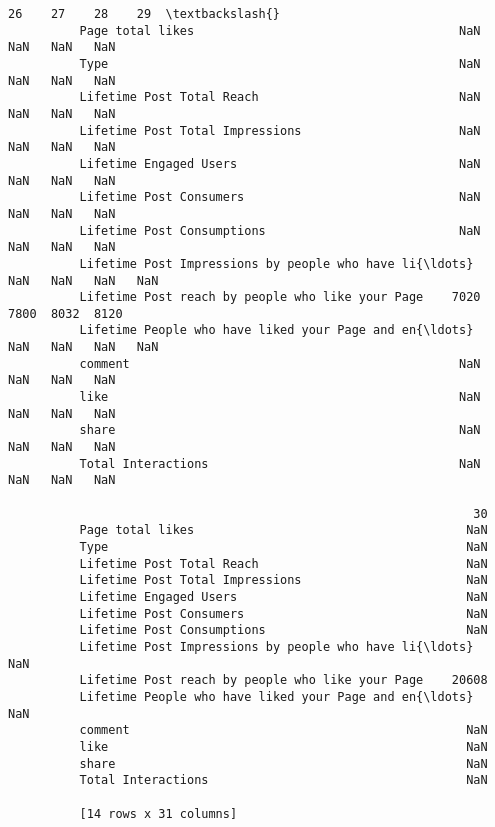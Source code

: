 \documentclass[11pt]{article}
\begin{document}
\begin{Verbatim}[commandchars=\\\{\}]
                                                                26    27    28    29  \textbackslash{}
          Page total likes                                     NaN   NaN   NaN   NaN   
          Type                                                 NaN   NaN   NaN   NaN   
          Lifetime Post Total Reach                            NaN   NaN   NaN   NaN   
          Lifetime Post Total Impressions                      NaN   NaN   NaN   NaN   
          Lifetime Engaged Users                               NaN   NaN   NaN   NaN   
          Lifetime Post Consumers                              NaN   NaN   NaN   NaN   
          Lifetime Post Consumptions                           NaN   NaN   NaN   NaN   
          Lifetime Post Impressions by people who have li{\ldots}   NaN   NaN   NaN   NaN   
          Lifetime Post reach by people who like your Page    7020  7800  8032  8120   
          Lifetime People who have liked your Page and en{\ldots}   NaN   NaN   NaN   NaN   
          comment                                              NaN   NaN   NaN   NaN   
          like                                                 NaN   NaN   NaN   NaN   
          share                                                NaN   NaN   NaN   NaN   
          Total Interactions                                   NaN   NaN   NaN   NaN   
          
                                                                 30  
          Page total likes                                      NaN  
          Type                                                  NaN  
          Lifetime Post Total Reach                             NaN  
          Lifetime Post Total Impressions                       NaN  
          Lifetime Engaged Users                                NaN  
          Lifetime Post Consumers                               NaN  
          Lifetime Post Consumptions                            NaN  
          Lifetime Post Impressions by people who have li{\ldots}    NaN  
          Lifetime Post reach by people who like your Page    20608  
          Lifetime People who have liked your Page and en{\ldots}    NaN  
          comment                                               NaN  
          like                                                  NaN  
          share                                                 NaN  
          Total Interactions                                    NaN  
          
          [14 rows x 31 columns]
\end{Verbatim}
            
\end{document}
